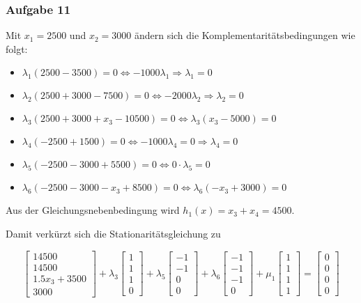 \documentclass[a4paper, 12pt]{report}
\begin{document}
\subsubsection{Aufgabe 11}
Mit $x_1 = 2500$ und $x_2 = 3000$ ändern sich die Komplementaritätsbedingungen wie folgt:
\begin{itemize}
  \item $ \lambda_1(2500 - 3500) = 0 \Leftrightarrow -1000\lambda_1 \Rightarrow \lambda_1 = 0 $
  \item $ \lambda_2(2500 + 3000 - 7500) = 0 \Leftrightarrow -2000\lambda_2 \Rightarrow \lambda_2 = 0 $
  \item $ \lambda_3(2500 + 3000 + x_3 - 10500) = 0 \Leftrightarrow \lambda_3(x_3 - 5000) = 0$
  \item $ \lambda_4(-2500 + 1500) = 0 \Leftrightarrow -1000\lambda_4 = 0 \Rightarrow \lambda_4 = 0$
  \item $ \lambda_5(-2500 - 3000 + 5500) = 0 \Leftrightarrow 0\cdot \lambda_5 = 0 $
  \item $ \lambda_6(-2500 - 3000 -x_3 + 8500) = 0 \Leftrightarrow \lambda_6(-x_3 + 3000) = 0 $
\end{itemize}
Aus der Gleichungsnebenbedingung wird $h_1(x) = x_3 + x_4 = 4500$.\par
Damit verkürzt sich die Stationaritätsgleichung zu

$$ \begin{bmatrix}14500\\14500\\1.5x_3 + 3500\\3000\end{bmatrix} + \lambda_3 \begin{bmatrix}1\\1\\1\\0\end{bmatrix} + \lambda_5 \begin{bmatrix}-1\\-1\\0\\0\end{bmatrix} + \lambda_6 \begin{bmatrix} -1\\-1\\-1\\0 \end{bmatrix} + \mu_1 \begin{bmatrix}1\\1\\1\\1\end{bmatrix} = \begin{bmatrix}0\\0\\0\\0\end{bmatrix} $$
\end{document}
